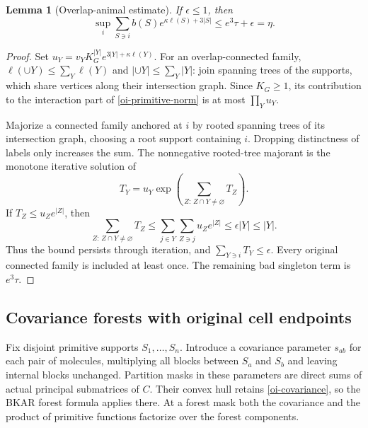 \documentclass[11pt]{article}
\newtheorem{lemma}[theorem]{Lemma}
\begin{document}
\begin{lemma}[Overlap-animal estimate]\label{oi-animal}
If $\epsilon\le1$, then
\begin{equation}\label{oi-primitive-norm}
 \sup_i\sum_{S\ni i}b(S)e^{\kappa\ell(S)+3|S|}
       \le e^3\tau+\epsilon=\eta .
\end{equation}
\end{lemma}
\begin{proof}
Set $u_Y=v_YK_G^{|Y|}e^{3|Y|+\kappa\ell(Y)}$.
For an overlap-connected family,
$\ell(\cup Y)\le\sum_Y\ell(Y)$ and
$|\cup Y|\le\sum_Y|Y|$: join spanning trees of the supports,
which share vertices along their intersection graph.
Since $K_G\ge1$, its contribution to the interaction part of
\eqref{oi-primitive-norm} is at most $\prod_Yu_Y$.

Majorize a connected family anchored at $i$ by rooted spanning
trees of its intersection graph, choosing a root support containing
$i$. Dropping distinctness of labels only increases the sum.
The nonnegative rooted-tree majorant is the monotone iterative
solution of
\[
 T_Y=u_Y\exp\left(\sum_{Z:\,Z\cap Y\ne\varnothing}T_Z\right).
\]
If $T_Z\le u_Ze^{|Z|}$, then
\[
 \sum_{Z:\,Z\cap Y\ne\varnothing}T_Z
 \le\sum_{j\in Y}\sum_{Z\ni j}u_Ze^{|Z|}
 \le\epsilon |Y|\le |Y|.
 \]
Thus the bound persists through iteration, and
$\sum_{Y\ni i}T_Y\le\epsilon$. Every original connected family
is included at least once. The remaining bad singleton term is
$e^3\tau$.
\end{proof}

\subsection{Covariance forests with original cell endpoints}

Fix disjoint primitive supports $S_1,\ldots,S_n$. Introduce a
covariance parameter $s_{ab}$ for each pair of molecules, multiplying
all blocks between $S_a$ and $S_b$ and leaving internal blocks
unchanged. Partition masks in these parameters are direct sums of
actual principal submatrices of $C$. Their convex hull retains
\eqref{oi-covariance}, so the BKAR forest formula applies there.
At a forest mask both the covariance and the product of primitive
functions factorize over the forest components.
\end{document}
